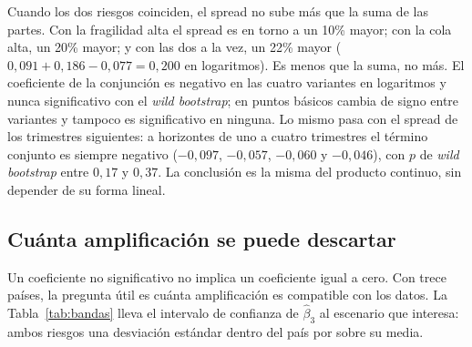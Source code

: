 Cuando los dos riesgos coinciden, el spread no sube más que la suma de las partes. Con la fragilidad alta el spread es en torno a un 10\% mayor; con la cola alta, un 20\% mayor; y con las dos a la vez, un 22\% mayor ($0{,}091+0{,}186-0{,}077=0{,}200$ en logaritmos). Es menos que la suma, no más. El coeficiente de la conjunción es negativo en las cuatro variantes en logaritmos y nunca significativo con el \textit{wild bootstrap}; en puntos básicos cambia de signo entre variantes y tampoco es significativo en ninguna. Lo mismo pasa con el spread de los trimestres siguientes: a horizontes de uno a cuatro trimestres el término conjunto es siempre negativo ($-0{,}097$, $-0{,}057$, $-0{,}060$ y $-0{,}046$), con $p$ de \textit{wild bootstrap} entre $0{,}17$ y $0{,}37$. La conclusión es la misma del producto continuo, sin depender de su forma lineal.

\subsection{Cuánta amplificación se puede descartar}
\label{sec:bandas-aditividad}

Un coeficiente no significativo no implica un coeficiente igual a cero. Con trece países, la pregunta útil es cuánta amplificación es compatible con los datos. La Tabla~\ref{tab:bandas} lleva el intervalo de confianza de $\hat\beta_3$ al escenario que interesa: ambos riesgos una desviación estándar dentro del país por sobre su media.

